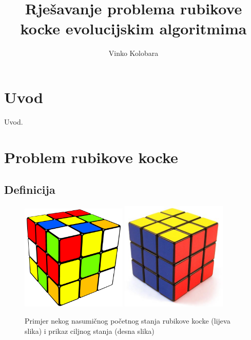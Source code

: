 \documentclass[times, utf8, seminar, numeric]{fer}
\begin{document}
\nocite{*}

\title{Rješavanje problema rubikove kocke evolucijskim algoritmima}

\author{Vinko Kolobara}


\maketitle

\tableofcontents

\chapter{Uvod}
Uvod.

\chapter{Problem rubikove kocke}
\section{Definicija}


\begin{figure}[h]
\centering
\includegraphics[width=0.45\textwidth]{image/scrambled_rubik's_cube.png}
\includegraphics[width=0.45\textwidth]{image/rubik_cube_goal_state.jpg}
\caption{Primjer nekog nasumičnog početnog stanja rubikove kocke (lijeva slika) i prikaz ciljnog stanja (desna slika) }
\end{figure}
\end{document}
